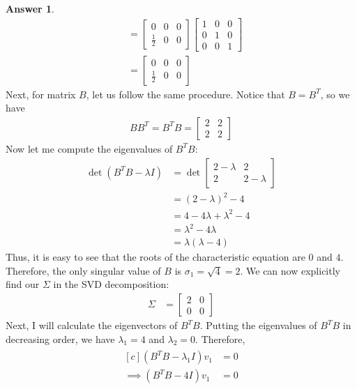 \documentclass[10pt,a4paper]{article}
\theoremstyle{definition}
\newtheorem*{answer*}{Answer}
\theoremstyle{definition}
\numberwithin{equation}{section}
\begin{document}
\begin{answer*}
\begin{align*}
&= \begin{bmatrix}
0 & 0 & 0\\
\frac{1}{2} & 0 & 0
\end{bmatrix} \begin{bmatrix}
1 & 0 & 0\\
0 & 1 & 0\\
0 & 0 & 1
\end{bmatrix}\\
&= \begin{bmatrix}
0 & 0 & 0\\
\frac{1}{2} & 0 & 0
\end{bmatrix}
\end{align*}
Next, for matrix $B$, let us follow the same procedure. Notice that $B = B^T$, so we have
\begin{align*}
BB^T = B^T B = \begin{bmatrix}
2 & 2\\
2 & 2
\end{bmatrix}
\end{align*}
Now let me compute the eigenvalues of $B^TB$:
\begin{align*}
\det(B^TB - \lambda I) &= \det \begin{bmatrix}
2 - \lambda & 2\\
2 & 2 - \lambda
\end{bmatrix}\\
&= (2 - \lambda)^2 - 4\\
&= 4 - 4\lambda + \lambda^2 - 4\\
&= \lambda^2 - 4\lambda\\
&= \lambda(\lambda - 4)
\end{align*}
Thus, it is easy to see that the roots of the characteristic equation are $0$ and $4$. Therefore, the only singular value of $B$ is $\sigma_1 = \sqrt{4} = 2$. We can now explicitly find our $\Sigma$ in the SVD decomposition:
\begin{align*}
\Sigma &= \begin{bmatrix}
2 & 0\\
0 & 0
\end{bmatrix}
\end{align*}
Next, I will calculate the eigenvectors of $B^TB$. Putting the eigenvalues of $B^TB$ in decreasing order, we have $\lambda_1 = 4$ and $\lambda_2 = 0$. Therefore, 
\begin{align*}
\begin{aligned}[c]
(B^T B - \lambda_1 I)v_1 &= 0\\
\implies (B^TB - 4I) v_1 &= 0\\

\end{aligned}
\end{align*}
\end{answer*}
\end{document}
